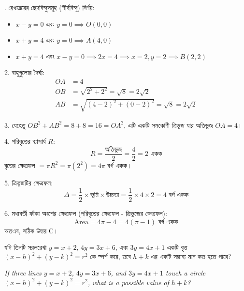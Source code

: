 \documentclass[12pt, a4paper]{article}
\begin{document}
\begin{tcolorbox}[solutionbox={সমাধান (Solution)}]
    . রেখাত্রয়ের ছেদবিন্দুসমূহ (শীর্ষবিন্দু) নির্ণয়:
    \begin{itemize}
        \item $x - y = 0$ এবং $y = 0 \implies O(0, 0)$
        \item $x + y = 4$ এবং $y = 0 \implies A(4, 0)$
        \item $x + y = 4$ এবং $x - y = 0 \implies 2x = 4 \implies x = 2, y = 2 \implies B(2, 2)$
    \end{itemize}
    
    2. বাহুগুলোর দৈর্ঘ্য:
    \begin{align*}
        OA &= 4 \\
        OB &= \sqrt{2^2+2^2} = \sqrt{8} = 2\sqrt{2} \\
        AB &= \sqrt{(4-2)^2 + (0-2)^2} = \sqrt{8} = 2\sqrt{2}
    \end{align*}
    
    3. যেহেতু $OB^2 + AB^2 = 8 + 8 = 16 = OA^2$, এটি একটি সমকোণী ত্রিভুজ যার অতিভুজ $OA = 4$।
    
    \vspace{0.5em}
    4. পরিবৃত্তের ব্যাসার্ধ $R$:
    \[ R = \frac{\text{অতিভুজ}}{2} = \frac{4}{2} = 2 \text{ একক} \]
    বৃত্তের ক্ষেত্রফল $= \pi R^2 = \pi(2^2) = 4\pi$ বর্গ একক।
    
    5. ত্রিভুজটির ক্ষেত্রফল:
    \[ \Delta = \frac{1}{2} \times \text{ভূমি} \times \text{উচ্চতা} = \frac{1}{2} \times 4 \times 2 = 4 \text{ বর্গ একক} \]
    
    6. মধ্যবর্তী ফাঁকা অংশের ক্ষেত্রফল (পরিবৃত্তের ক্ষেত্রফল - ত্রিভুজের ক্ষেত্রফল):
    \[ \text{Area} = 4\pi - 4 = 4(\pi - 1) \text{ বর্গ একক} \]
    অতএব, সঠিক উত্তর C।
\end{tcolorbox}

\begin{tcolorbox}[questionbox={প্রশ্ন (Question) 43}]
    \noindent
    যদি তিনটি সরলরেখা $y = x + 2$, $4y = 3x + 6$, এবং $3y = 4x + 1$ একটি বৃত্ত $(x - h)^2 + (y - k)^2 = r^2$ কে স্পর্শ করে, তবে $h + k$ এর একটি সম্ভাব্য মান কত হতে পারে?
    
    \vspace{0.8em}
    \begin{english}
    \noindent\textit{\color{darkgray}
    If three lines $y = x + 2$, $4y = 3x + 6$, and $3y = 4x + 1$ touch a circle $(x - h)^2 + (y - k)^2 = r^2$, what is a possible value of $h + k$?
    }
    \end{english}
\end{tcolorbox}
\end{document}
